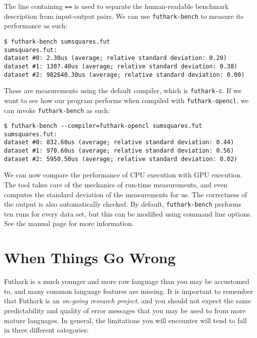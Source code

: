 \documentclass[oneside,11pt]{book}
\begin{document}


The line containing \texttt{==} is used to separate the human-readable
benchmark description from input-output pairs.  We can use
\texttt{futhark-bench} to measure its performance as such:

\begin{verbatim}
$ futhark-bench sumsquares.fut
sumsquares.fut:
dataset #0: 2.30us (average; relative standard deviation: 0.20)
dataset #1: 1307.40us (average; relative standard deviation: 0.38)
dataset #2: 982640.30us (average; relative standard deviation: 0.00)
\end{verbatim}

These are measurements using the default compiler, which is
\texttt{futhark-c}.  If we want to see how our program performs when
compiled with \texttt{futhark-opencl}, we can invoke
\texttt{futhark-bench} as such:

\begin{verbatim}
$ futhark-bench --compiler=futhark-opencl sumsquares.fut
sumsquares.fut:
dataset #0: 832.60us (average; relative standard deviation: 0.44)
dataset #1: 970.60us (average; relative standard deviation: 0.56)
dataset #2: 5950.50us (average; relative standard deviation: 0.02)
\end{verbatim}

We can now compare the performance of CPU execution with GPU
execution.  The tool takes care of the mechanics of run-time
measurements, and even computes the standard deviation of the
measurements for us.  The correctness of the output is also
automatically checked.  By default, \texttt{futhark-bench} performs
ten runs for every data set, but this can be modified using command
line options.  See the manual page for more information.

\section{When Things Go Wrong}

Futhark is a much younger and more raw language than you may be
accustomed to, and many common language features are missing.  It is
important to remember that Futhark is an \textit{on-going research
  project}, and you should not expect the same predictability and
quality of error messages that you may be used to from more mature
languages.  In general, the limitations you will encounter will tend
to fall in three different categories:
\end{document}
